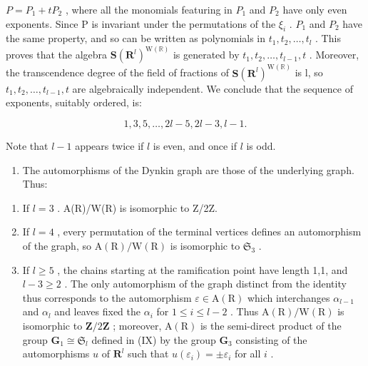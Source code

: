 \(P = P_{1} + tP_{2}\) , where all the monomials featuring in \(P_{1}\) and \(P_{2}\) have only even exponents. Since P is invariant under the permutations of the \(\xi_{i}\) . \(P_{1}\) and \(P_{2}\) have the same property, and so can be written as polynomials in \(t_{1}, t_{2}, \ldots, t_{l}\) . This proves that the algebra \(\mathbf{S}(\mathbf{R}^{l})^{\mathrm{W}(\mathbb{R})}\) is generated by \(t_{1}, t_{2}, \ldots, t_{l-1}, t\) . Moreover, the transcendence degree of the field of fractions of \(\mathbf{S}(\mathbf{R}^{l})^{\mathrm{W}(\mathbb{R})}\) is l, so \(t_{1}, t_{2}, \ldots, t_{l-1}, t\) are algebraically independent. We conclude that the sequence of exponents, suitably ordered, is:

\[
1, 3, 5, \dots , 2 l - 5, 2 l - 3, l - 1.
\]

Note that \(l - 1\) appears twice if \(l\) is even, and once if \(l\) is odd.

\begin{enumerate}
\def\labelenumi{(\Roman{enumi})}
\setcounter{enumi}{10}
\tightlist
\item
  The automorphisms of the Dynkin graph are those of the underlying graph. Thus:
\end{enumerate}

\begin{enumerate}
\def\labelenumi{\arabic{enumi})}
\item
  If \(l = 3\) . A(R)/W(R) is isomorphic to Z/2Z.
\item
  If \(l = 4\) , every permutation of the terminal vertices defines an automorphism of the graph, so \(\mathrm{A}(\mathrm{R}) / \mathrm{W}(\mathrm{R})\) is isomorphic to \(\mathfrak{S}_3\) .
\item
  If \(l \geqslant 5\) , the chains starting at the ramification point have length 1,1, and \(l - 3 \geqslant 2\) . The only automorphism of the graph distinct from the identity thus corresponds to the automorphism \(\varepsilon \in \mathrm{A}(\mathrm{R})\) which interchanges \(\alpha_{l-1}\) and \(\alpha_l\) and leaves fixed the \(\alpha_i\) for \(1 \leqslant i \leqslant l - 2\) . Thus \(\mathrm{A}(\mathrm{R}) / \mathrm{W}(\mathrm{R})\) is isomorphic to \(\mathbf{Z}/2\mathbf{Z}\) ; moreover, \(\mathrm{A}(\mathrm{R})\) is the semi-direct product of the group \(\mathbf{G}_1 \cong \mathfrak{S}_l\) defined in (IX) by the group \(\mathbf{G}_3\) consisting of the automorphisms \(u\) of \(\mathbf{R}^l\) such that \(u(\varepsilon_i) = \pm \varepsilon_i\) for all \(i\) .
\end{enumerate}

